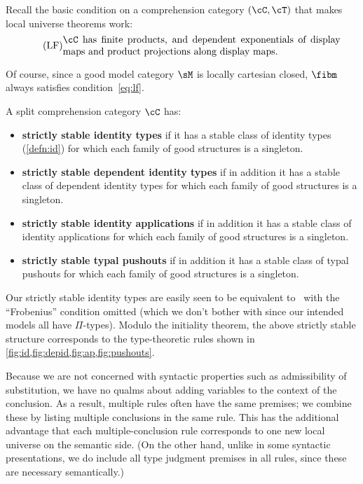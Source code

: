 \documentclass{amsart}
\let\C\cC
\let\T\cT
\begin{document}
Recall the basic condition on a comprehension category $(\C,\T)$ that makes local universe theorems work:
\begin{equation}
  \label{eq:lf}
  \tag{LF} \parbox{10cm}{$\C$ has finite products, and dependent exponentials of display maps and product projections along display maps.}
\end{equation}

Of course, since a good model category $\sM$ is locally cartesian closed, $\fibm$ always satisfies condition~\eqref{eq:lf}.

\begin{defn}
  A split comprehension category $\C$ has:
  \begin{itemize}
  \item \textbf{strictly stable identity types} if it has a stable class of identity types (\cref{defn:id}) for which each family of good structures is a singleton.
  \item \textbf{strictly stable dependent identity types} if in addition it has a stable class of dependent identity types for which each family of good structures is a singleton.
  \item \textbf{strictly stable identity applications} if in addition it has a stable class of identity applications for which each family of good structures is a singleton.
  \item \textbf{strictly stable typal pushouts} if in addition it has a stable class of typal pushouts for which each family of good structures is a singleton.
\end{itemize}
\end{defn}

Our strictly stable identity types are easily seen to be equivalent to~\cite[Definition 3.4.3.1]{lw:localuniv} with the ``Frobenius'' condition omitted (which we don't bother with since our intended models all have $\Pi$-types).
Modulo the initiality theorem, the above strictly stable structure corresponds to the type-theoretic rules shown in \cref{fig:id,fig:depid,fig:ap,fig:pushouts}.

\begin{rmk}\label{rmk:rule-style}
  Because we are not concerned with syntactic properties such as admissibility of substitution, we have no qualms about adding variables to the context of the conclusion.
  As a result, multiple rules often have the same premises; we combine these by listing multiple conclusions in the same rule.
  This has the additional advantage that each multiple-conclusion rule corresponds to one new local universe on the semantic side.
  (On the other hand, unlike in some syntactic presentations, we do include all type judgment premises in all rules, since these are necessary semantically.)
\end{rmk}
\end{document}
